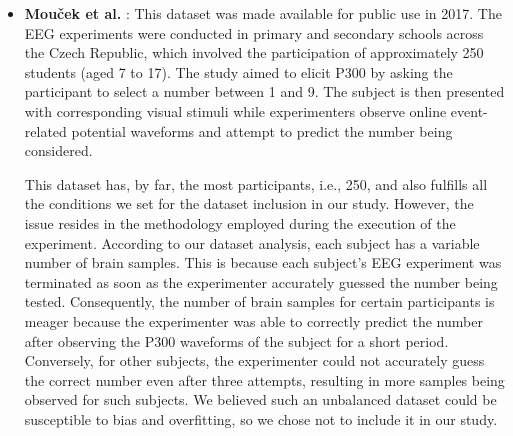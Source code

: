 \begin{itemize}
\item \textbf{Mouček et al.} \cite{mouvcek2017event}: This dataset was made available for public use in 2017. The EEG experiments were conducted in primary and secondary schools across the Czech Republic, which involved the participation of approximately 250 students (aged 7 to 17). The study aimed to elicit P300 by asking the participant to select a number between 1 and 9. The subject is then presented with corresponding visual stimuli while experimenters observe online event-related potential waveforms and attempt to predict the number being considered.     
\smallskip

This dataset has, by far, the most participants, i.e., 250, and also fulfills all the conditions we set for the dataset inclusion in our study. However, the issue resides in the methodology employed during the execution of the experiment. According to our dataset analysis, each subject has a variable number of brain samples. This is because each subject's EEG experiment was terminated as soon as the experimenter accurately guessed the number being tested. Consequently, the number of brain samples for certain participants is meager because the experimenter was able to correctly predict the number after observing the P300 waveforms of the subject for a short period. Conversely, for other subjects, the experimenter could not accurately guess the correct number even after three attempts, resulting in more samples being observed for such subjects. We believed such an unbalanced dataset could be susceptible to bias and overfitting, so we chose not to include it in our study. 




\end{itemize}
